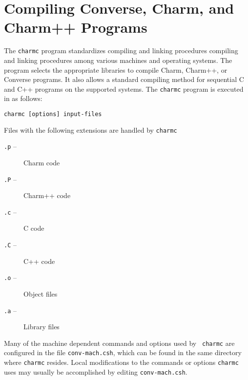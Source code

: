 %
%
%
%
%
%
%
%
%

\section{Compiling Converse, Charm, and Charm++ Programs}

The {\tt charmc} program standardizes compiling and linking procedures
compiling and linking procedures among various machines and operating
systems.  The program selects the appropriate libraries to compile
Charm, Charm++, or Converse programs.  It also allows a standard
compiling method for sequential C and C++ programs on the supported
systems.  The {\tt charmc} program is executed in as follows:

\begin{verbatim}
charmc [options] input-files
\end{verbatim}

Files with the following extensions are handled by {\verb+charmc+}
\begin{description}
\item[{\verb+.p+} -- ] Charm code
\item[{\verb+.P+} -- ] Charm++ code
\item[{\verb+.c+} -- ] C code
\item[{\verb+.C+} -- ] C++ code
\item[{\verb+.o+} -- ] Object files
\item[{\verb+.a+} -- ] Library files
\end{description}

Many of the machine dependent commands and options used by {\tt
charmc} are configured in the file {\tt conv-mach.csh}, which can be
found in the same directory where {\tt charmc} resides.  Local
modifications to the commands or options {\tt charmc} uses may usually
be accomplished by editing {\tt conv-mach.csh}.

